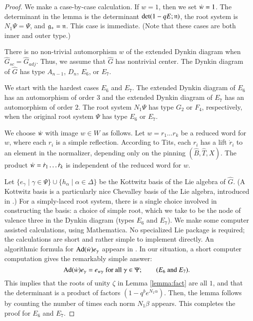 \begin{proof} We make a case-by-case calculation. 
If $w=1$, then we set $\dot w=1$.   The determinant in the lemma is the determinant
$\det(1- q E;{\mathfrak n})$, the root system is $N_1\Psi =\Psi$, and ${\mathfrak g}_+ = {\mathfrak n}$.
This case is immediate.  (Note that these cases are both inner and outer type.)

There is no non-trivial automorphism $w$ of the extended Dynkin diagram 
when  $\hat G_{sc} = \hat G_{adj}$.  Thus, we assume that $\hat G$ has nontrivial center.
The Dynkin diagram of $\hat G$ has type $A_{n-1}$, $D_n$, $E_6$, or $E_7$.

We start with the hardest cases
 $E_6$ and $E_7$.  
The extended Dynkin diagram of $E_6$
has an automorphism of order $3$ and the extended Dynkin diagram of $E_7$ has an automorphism of order $2$.
The root system $N_1\Psi$ has type $G_2$ or $F_4$, respectively, when the original root system $\Psi$  has type $E_6$ or $E_7$.

We choose $\dot w$ with image $w\in W$ as follows.  Let $w=r_1\ldots r_k$ be  a reduced word for $w$, where each $r_i$ is a simple reflection.
According to Tits, each $r_i$ has a lift $\dot r_i$ to an element in the normalizer, depending only on the pinning $(\hat B,\hat T,X)$.
The product $\dot w = \dot r_1\ldots \dot r_k$ is independent of the reduced word for $w$.

Let $\{ e_\gamma \mid \gamma\in \Psi\}\cup \{h_\alpha\mid \alpha\in\Delta\}$ 
be the Kottwitz basis of the Lie algebra of $\hat G$.
(A Kottwitz basis is a particularly nice
Chevalley basis of the Lie algebra, introduced in \cite{cassstructure}.)  For a simply-laced root system, there is a single choice
involved in constructing the basis: a choice of simple root, which we take to be the node of valence three in the Dynkin diagram (types $E_6$ and $E_7$).
We make some 
computer assisted calculations, using Mathematica.  No specialized Lie package is required; the calculations are short and rather simple
to implement directly.
An algorithmic formula for ${\operatorname{Ad}}(\dot w) e_\gamma$ appears in \cite{cassstructure}.   In our situation, a short computer computation gives the remarkably simple answer:
\[
{\operatorname{Ad}}(\dot w) e_\gamma = e_{w\gamma}\text{ for all } \gamma\in \Psi;\qquad (E_6 \text{ and } E_7).
\]
This implies that the roots of unity $\zeta$ in Lemma \ref{lemma:fact} are all $1$, and that the determinant is a product of factors
$(1-q^b e^{N_1\alpha})$.  Then, the lemma follows by counting the number of times each norm $N_1\beta$ appears.  This completes the proof for $E_6$ and $E_7$.


\end{proof}
